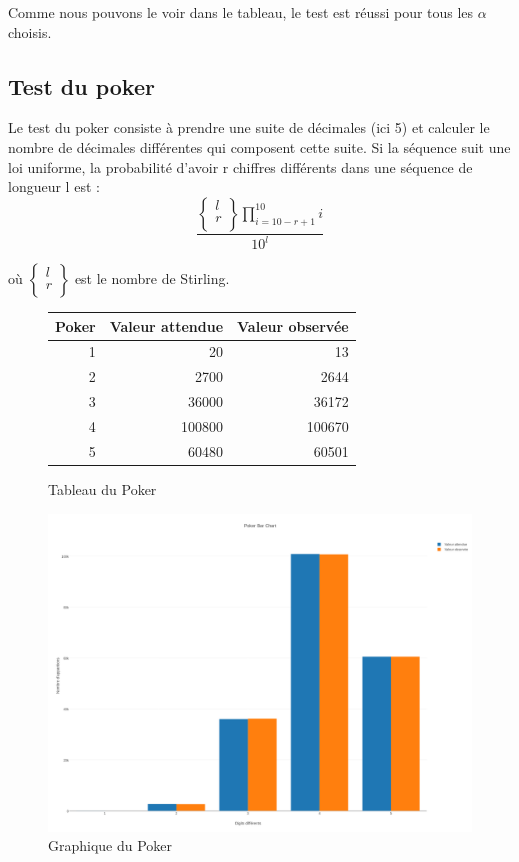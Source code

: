 \documentclass[10pt,a4paper]{article}
\begin{document}
	Comme nous pouvons le voir dans le tableau, le test est réussi pour tous les $\alpha$ choisis.
	
	\newpage
	\subsection{Test du poker}
	
	Le test du poker consiste à prendre une suite de décimales (ici 5) et calculer le nombre de décimales différentes qui composent cette suite. Si la séquence suit une loi uniforme, la probabilité d'avoir r chiffres différents dans une séquence de longueur l est :
	\[
		\frac{
			\left\{
				\begin{array}{l}
					l\\
					r\\
				\end{array}
			\right\}
			\prod_{i=10-r+1}^{10}i
		}{10^l}
	\]
	
	où $\left\{
	\begin{array}{l}
	l\\
	r\\
	\end{array}
	\right\}$ est le nombre de Stirling.
	
	\begin{figure}[h]
		\centering
		\begin{tabular}{|r|r|r|}
			\hline
			Poker & Valeur attendue & Valeur observée\\
			\hline
			1 & 20 & 13\\
			2 & 2700 & 2644\\
			3 & 36000 & 36172\\
			4 & 100800 & 100670\\
			5 & 60480 & 60501\\
			\hline
		\end{tabular}
		\caption{Tableau du Poker}
	\end{figure}
	
	\begin{figure}[h]
		\centering
		\includegraphics[scale=0.25]{../chart_images/poker_bar_chart.png}
		\caption{Graphique du Poker}
	\end{figure}
	
\end{document}
